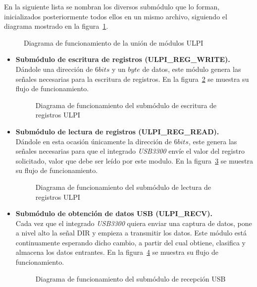 En la siguiente lista se nombran los diversos submódulo que lo forman, inicializados posteriormente todos ellos en un mismo archivo, siguiendo el diagrama mostrado en la figura~\ref{fig:flujo_ulpi_main}.

\begin{figure}[!hbt]
    \centering
    \scalebox{0.8} {}
    \caption{Diagrama de funcionamiento de la unión de módulos ULPI}
    \label{fig:flujo_ulpi_main}
\end{figure}

\begin{itemize}
    \item \textbf{Submódulo de escritura de registros (ULPI\_REG\_WRITE).} \\
    Dándole una dirección de $6bits$ y un $byte$ de datos, este módulo genera las señales necesarias para la escritura de registros. En la figura~\ref{fig:flujo_ulpi_write} se muestra su flujo de funcionamiento.
    \begin{figure}[!hbt]
        \centering
        \scalebox{0.8} {}
        \caption{Diagrama de funcionamiento del submódulo de escritura de registros ULPI}
        \label{fig:flujo_ulpi_write}
    \end{figure}
    
    \item \textbf{Submódulo de lectura de registros (ULPI\_REG\_READ).} \\
    Dándole en esta ocasión únicamente la dirección de $6bits$, este genera las señales necesarias para que el integrado \emph{USB3300} envíe el valor del registro solicitado, valor que debe ser leído por este modulo. En la figura~\ref{fig:flujo_ulpi_read} se muestra su flujo de funcionamiento.
    \begin{figure}[!hbt]
        \centering
        \scalebox{0.8} {}
        \caption{Diagrama de funcionamiento del submódulo de lectura de registros ULPI}
        \label{fig:flujo_ulpi_read}
    \end{figure}
    
    \item \textbf{Submódulo de obtención de datos USB (ULPI\_RECV).} \\
    Cada vez que el integrado \emph{USB3300} quiera enviar una captura de datos, pone a nivel alto la señal DIR y empieza a transmitir los datos. Este módulo está continuamente esperando dicho cambio, a partir del cual obtiene, clasifica y almacena los datos entrantes. En la figura~\ref{fig:flujo_ulpi_recv} se muestra su flujo de funcionamiento.
    \begin{figure}[!hbt]
        \centering
        \scalebox{0.8} {}
        \caption{Diagrama de funcionamiento del submódulo de recepción USB}
        \label{fig:flujo_ulpi_recv}
    \end{figure}
\end{itemize}



